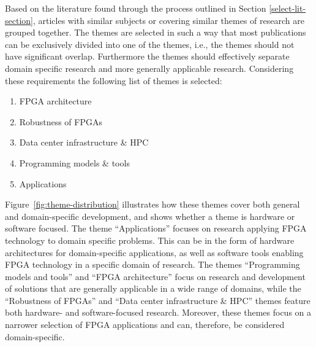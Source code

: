 \label{themes-section}
Based on the literature found through the process outlined in Section \ref{select-lit-section}, articles with similar subjects or covering similar themes of research are grouped together. The themes are selected in such a way that most publications can be exclusively divided into one of the themes, i.e., the themes should not have significant overlap. Furthermore the themes should effectively separate domain specific research and more generally applicable research. %
Considering these requirements the following list of themes is selected:

\begin{enumerate}
    \item FPGA architecture
    \item Robustness of FPGAs
    \item Data center infrastructure \& HPC
    \item Programming models \& tools
    \item Applications
\end{enumerate}

Figure~\ref{fig:theme-distribution} illustrates how these themes cover both general and domain-specific development, and shows whether a theme is hardware or software focused. The theme ``Applications'' focuses on research applying FPGA technology to domain specific problems. This can be in the form of hardware architectures for domain-specific applications, as well as software tools enabling FPGA technology in a specific domain of research. The themes ``Programming models and tools'' and ``FPGA architecture'' focus on research and development of solutions that are generally applicable in a wide range of domains, while the ``Robustness of FPGAs'' and ``Data center infrastructure \& HPC'' themes feature both hardware- and software-focused research. Moreover, these themes focus on a narrower selection of FPGA applications and can, therefore, be considered  domain-specific. 

